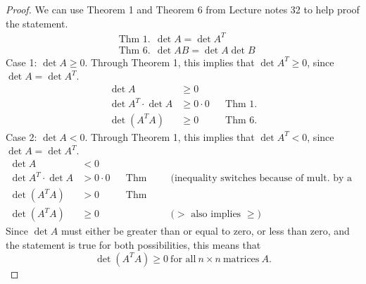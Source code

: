 \documentclass{article}
\begin{document}
\begin{proof}
    We can use Theorem 1 and Theorem 6 from Lecture notes 32 to help proof the statement.
    \begin{align*}
         & \text{Thm 1.}~~ \det A = \det A^T       \\
         & \text{Thm 6.}~~ \det AB = \det A \det B
    \end{align*}
    Case 1: $\det A \geq 0$. Through Theorem 1, this implies that $\det A^T \geq 0$, since $\det A = \det A^T$.
    \begin{align*}
        \det A                & \geq 0                            \\
        \det A^T \cdot \det A & \geq 0 \cdot 0 &  & \text{Thm 1.} \\
        \det (A^TA)           & \geq 0         &  & \text{Thm 6.}
    \end{align*}
    Case 2: $\det A < 0$. Through Theorem 1, this implies that $\det A^T < 0$, since $\det A = \det A^T$.
    \begin{align*}
        \det A                & < 0                                                                                             \\
        \det A^T \cdot \det A & > 0 \cdot 0 &  & \text{Thm 1.} &  & \text{(inequality switches because of mult. by a negative)} \\
        \det (A^TA)           & > 0         &  & \text{Thm 6.}                                                                  \\
        \det (A^TA)           & \geq 0      &  &               &  & \text{($>$ also implies $\geq$)}
    \end{align*}
    Since $\det A$ must either be greater than or equal to zero, or less than zero, and the statement is true for both possibilities, this means that
    \[
        \det(A^TA) \geq 0~\text{for all}~n \times n~\text{matrices}~A.
    \]
\end{proof}
\qdash
\end{document}
